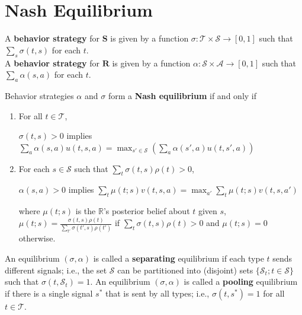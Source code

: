\documentclass[11pt]{elegantbook}
\begin{document}
\section{Nash Equilibrium}
\begin{definition}[Strategy]
    \normalfont
    A \textbf{behavior strategy} for $\mathbf{S}$ is given by a function $\sigma: \mathcal{T}\times\mathcal{S} \rightarrow [0,1]$ such that $\sum_s \sigma(t,s)$ for each $t$.\\
    A \textbf{behavior strategy} for $\mathbf{R}$ is given by a function $\alpha: \mathcal{S}\times\mathcal{A} \rightarrow [0,1]$ such that $\sum_a \alpha(s,a)$ for each $t$.
\end{definition}

\begin{definition}
    \normalfont
    Behavior strategies $\alpha$ and $\sigma$ form a \textbf{Nash equilibrium} if and only if
    \begin{enumerate}
        \item For all $t\in \mathcal{T}$,
        \begin{center}
            $\sigma(t,s)>0$ implies $\sum_a \alpha(s,a)u(t,s,a) = \max_{s'\in \mathcal{S}}\left(\sum_a \alpha(s',a)u(t,s',a)\right)$
        \end{center}
        \item For each $s\in \mathcal{S}$ such that $\sum_{t}\sigma(t,s)\rho(t)>0$,
        \begin{center}
            $\alpha(s,a)>0$ implies $\sum_{t}\mu(t;s)v(t,s,a) = \max_{a'}\sum_{t}\mu(t;s)v(t,s,a')$
        \end{center}
        where $\mu(t;s)$ is the $\mathbb{R}$'s posterior belief about $t$ given $s$, $\mu(t;s)=\frac{\sigma(t,s)\rho(t)}{\sum_{t'}\sigma(t',s)\rho(t')}$ if $\sum_t\sigma(t,s)\rho(t)>0$ and $\mu(t;s)=0$ otherwise.
    \end{enumerate}
\end{definition}

\begin{definition}
    \normalfont
    An equilibrium $(\sigma,\alpha)$ is called a \textbf{separating} equilibrium if each type $t$ sends different signals; i.e., the set $\mathcal{S}$ can be partitioned into (disjoint) sets $\{\mathcal{S}_t; t\in \mathcal{S}\}$ such that $\sigma(t, \mathcal{S}_t) = 1$. An equilibrium $(\sigma,\alpha)$ is called a \textbf{pooling} equilibrium if there is a single signal $s^*$ that is sent by all types; i.e., $\sigma(t, s^*) = 1$ for all $t\in \mathcal{T}$.
\end{definition}
\end{document}
